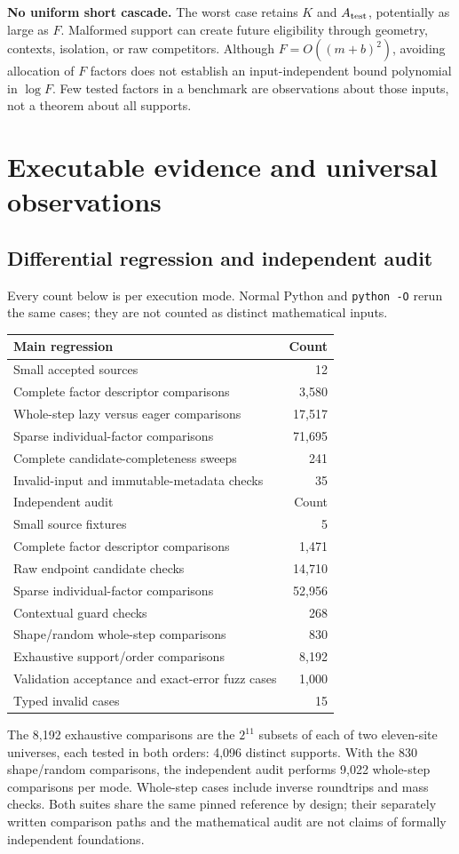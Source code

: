 \documentclass[11pt,a4paper]{article}
\numberwithin{equation}{section}
\begin{document}
\textbf{No uniform short cascade.} The worst case retains $K$ and $A_{\rm test}$, potentially as large as $F$. Malformed support can create future eligibility through geometry, contexts, isolation, or raw competitors. Although $F=O((m+b)^2)$, avoiding allocation of $F$ factors does not establish an input-independent bound polynomial in $\log F$. Few tested factors in a benchmark are observations about those inputs, not a theorem about all supports.

\section{Executable evidence and universal observations}\label{fpa:lz:sec:evidence}
\subsection{Differential regression and independent audit}
Every count below is per execution mode. Normal Python and \texttt{python -O} rerun the same cases; they are not counted as distinct mathematical inputs.
\begin{center}
\begin{tabular}{@{}lr@{}}
\toprule
Main regression & Count\\
\midrule
Small accepted sources & 12\\
Complete factor descriptor comparisons & 3,580\\
Whole-step lazy versus eager comparisons & 17,517\\
Sparse individual-factor comparisons & 71,695\\
Complete candidate-completeness sweeps & 241\\
Invalid-input and immutable-metadata checks & 35\\
\midrule
Independent audit & Count\\
\midrule
Small source fixtures & 5\\
Complete factor descriptor comparisons & 1,471\\
Raw endpoint candidate checks & 14,710\\
Sparse individual-factor comparisons & 52,956\\
Contextual guard checks & 268\\
Shape/random whole-step comparisons & 830\\
Exhaustive support/order comparisons & 8,192\\
Validation acceptance and exact-error fuzz cases & 1,000\\
Typed invalid cases & 15\\
\bottomrule
\end{tabular}
\end{center}
The 8,192 exhaustive comparisons are the $2^{11}$ subsets of each of two eleven-site universes, each tested in both orders: 4,096 distinct supports. With the 830 shape/random comparisons, the independent audit performs 9,022 whole-step comparisons per mode. Whole-step cases include inverse roundtrips and mass checks. Both suites share the same pinned reference by design; their separately written comparison paths and the mathematical audit are not claims of formally independent foundations.
\end{document}
